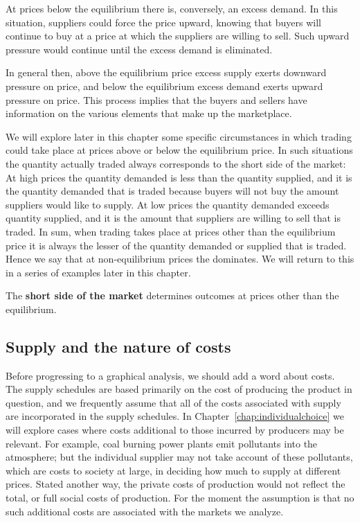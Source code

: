 \newhtmlpage

At prices below the equilibrium there is, conversely, an excess demand. In
this situation, suppliers could force the price upward, knowing that buyers
will continue to buy at a price at which the suppliers are willing to sell.
Such upward pressure would continue until the excess demand is eliminated.

In general then, above the equilibrium price excess supply exerts downward
pressure on price, and below the equilibrium excess demand exerts upward
pressure on price. This process implies that the buyers and sellers have
information on the various elements that make up the marketplace.

We will explore later in this chapter some specific circumstances in which
trading could take place at prices above or below the equilibrium price. In
such situations the quantity actually traded always corresponds to the short
side of the market: At high prices the quantity demanded is less than
the quantity supplied, and it is the quantity demanded that is traded because buyers will
not buy the amount suppliers would like to supply. At low prices the
quantity demanded exceeds quantity supplied, and it is the amount that
suppliers are willing to sell that is traded. In sum, when trading takes
place at prices other than the equilibrium price it is always the lesser of
the quantity demanded or supplied that is traded. Hence we say that at non-equilibrium
prices the  dominates. We will return to
this in a series of examples later in this chapter.

\begin{DefBox}
The \textbf{short side of the market} determines outcomes at prices other than the equilibrium.
\end{DefBox}

\subsection*{Supply and the nature of costs}

Before progressing to a graphical analysis, we should add a word about
costs. The supply schedules are based primarily on the cost of producing the
product in question, and we frequently assume that all of the costs
associated with supply are incorporated in the supply schedules. In
Chapter~\ref{chap:individualchoice} we will explore cases where costs additional to
those incurred by producers may be relevant. For example, coal burning power
plants emit pollutants into the atmosphere; but the individual supplier may
not take account of these pollutants, which are costs to society at large,
in deciding how much to supply at different prices. Stated another way, the
private costs of production would not reflect the total, or full social
costs of production. For the moment the assumption is that no such
additional costs are associated with the markets we analyze.